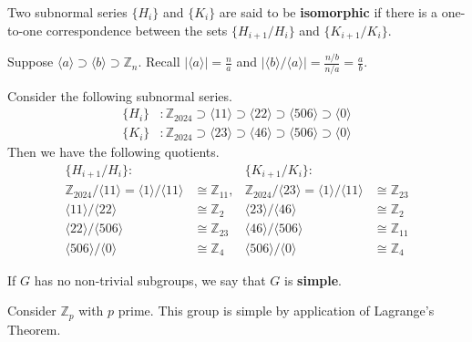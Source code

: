 \begin{definition}
	Two subnormal series $\{H_i\}$ and $\{K_i\}$ are said to be \textbf{isomorphic} if there is a one-to-one correspondence between the sets $\{H_{i+1}/H_i\}$ and $\{K_{i+1}/K_i\}$.
\end{definition}

\begin{remark}
	Suppose $\langle a\rangle\supset\langle b\rangle\supset\mathbb Z_n$. Recall $|\langle a\rangle|=\frac na$ and $|\langle b\rangle/\langle a\rangle|=\frac{n/b}{n/a}=\frac ab$.
\end{remark}

\begin{example}\label{ex:isomorphic_series}
	Consider the following subnormal series.
	\begin{align*}
		\{H_i\}&:\mathbb Z_{2024}\supset\langle 11\rangle\supset\langle 22\rangle\supset\langle 506\rangle\supset\langle 0\rangle\\
		\{K_i\}&:\mathbb Z_{2024}\supset\langle 23\rangle\supset\langle 46\rangle\supset\langle 506\rangle\supset\langle 0\rangle
	\end{align*}
	Then we have the following quotients.
	\begin{align*}
		\{H_{i+1}/H_i\}:& & \{K_{i+1}/K_i\}:\\
		\mathbb Z_{2024}/\langle 11\rangle=\langle 1\rangle/\langle 11\rangle&\cong\mathbb Z_{11},& \mathbb Z_{2024}/\langle 23\rangle=\langle 1\rangle/\langle 11\rangle&\cong\mathbb Z_{23}\\
		\langle 11\rangle/\langle 22\rangle &\cong\mathbb Z_2 & \langle 23\rangle/\langle 46\rangle &\cong\mathbb Z_2\\
		\langle 22\rangle/\langle 506\rangle&\cong\mathbb Z_{23} & \langle 46\rangle/\langle 506\rangle &\cong\mathbb Z_{11}\\
		\langle 506\rangle/\langle 0\rangle&\cong\mathbb Z_4 & \langle 506\rangle/\langle 0\rangle&\cong\mathbb Z_4
	\end{align*}
\end{example}

\begin{definition}
	If $G$ has no non-trivial subgroups, we say that $G$ is \textbf{simple}.
\end{definition}

\begin{example}
	Consider $\mathbb Z_p$ with $p$ prime. This group is simple by application of Lagrange's Theorem.
\end{example}

